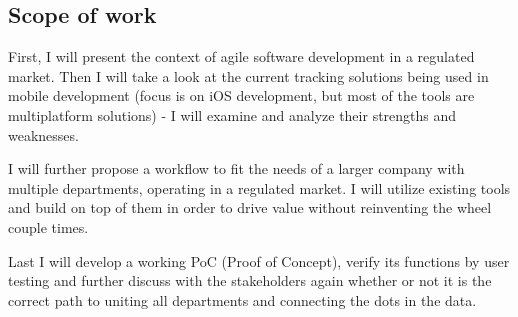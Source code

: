 \subsection*{Scope of work}

First, I will present the context of agile software development in a regulated market. Then I will take a look at the current tracking solutions being used in mobile development (focus is on iOS development, but most of the tools are multiplatform solutions) - I will examine and analyze their strengths and weaknesses. 

I will further propose a workflow to fit the needs of a larger company with multiple departments, operating in a regulated market. I will utilize existing tools and build on top of them in order to drive value without reinventing the wheel couple times.

Last I will develop a working PoC (Proof of Concept), verify its functions by user testing and further discuss with the stakeholders again whether or not it is the correct path to uniting all departments and connecting the dots in the data.